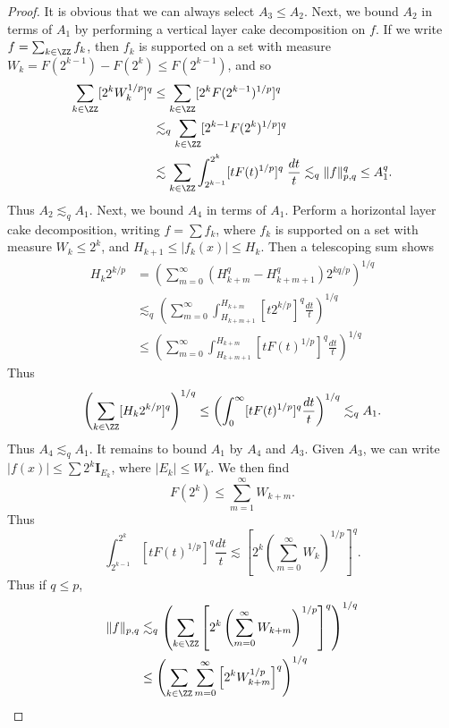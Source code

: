 \begin{proof}
    It is obvious that we can always select $A_3 \leq A_2$. Next, we bound $A_2$ in terms of $A_1$ by performing a vertical layer cake decomposition on $f$. If we write $f = \sum_{k \in \ZZ} f_k$, then $f_k$ is supported on a set with measure $W_k = F(2^{k-1}) - F(2^k) \leq F(2^{k-1})$, and so
    \begin{align*}
        \sum_{k \in \ZZ} [2^k W_k^{1/p}]^q &\leq \sum_{k \in \ZZ} [2^k F(2^{k-1})^{1/p}]^q\\
        &\lesssim_q \sum_{k \in \ZZ} [2^{k-1} F(2^k)^{1/p}]^q\\
        &\lesssim \sum_{k \in \ZZ} \int_{2^{k-1}}^{2^k} [tF(t)^{1/p}]^q\; \frac{dt}{t} \lesssim_q \| f \|_{p,q}^q \leq A_1^q.
    \end{align*}
    Thus $A_2 \lesssim_q A_1$. Next, we bound $A_4$ in terms of $A_1$. Perform a horizontal layer cake decomposition, writing $f = \sum f_k$, where $f_k$ is supported on a set with measure $W_k \leq 2^k$, and $H_{k+1} \leq |f_k(x)| \leq H_k$. Then a telescoping sum shows
    \begin{align*}
        H_k 2^{k/p} &= \left( \sum_{m = 0}^\infty (H_{k+m}^q - H_{k+m+1}^q) 2^{kq /p} \right)^{1/q}\\
        &\lesssim_q \left( \sum_{m = 0}^\infty \int_{H_{k+m+1}}^{H_{k+m}} [t 2^{k/p}]^q \frac{dt}{t} \right)^{1/q}\\
        &\leq \left( \sum_{m = 0}^\infty \int_{H_{k+m+1}}^{H_{k+m}} [t F(t)^{1/p}]^q \frac{dt}{t} \right)^{1/q}
    \end{align*}
    Thus
    \[ \left( \sum_{k \in \ZZ} [H_k 2^{k/p}]^q \right)^{1/q} \leq \left( \int_0^\infty [t F(t)^{1/p}]^q \frac{dt}{t} \right)^{1/q} \lesssim_q A_1. \]
    Thus $A_4 \lesssim_q A_1$. It remains to bound $A_1$ by $A_4$ and $A_3$. Given $A_3$, we can write $|f(x)| \leq \sum 2^k \mathbf{I}_{E_k}$, where $|E_k| \leq W_k$. We then find
    \[ F(2^k) \leq \sum_{m = 1}^\infty W_{k+m}. \]
    Thus
    \[ \int_{2^{k-1}}^{2^k} [t F(t)^{1/p}]^q \frac{dt}{t} \lesssim \left[ 2^k \left(\sum_{m = 0}^\infty W_k \right)^{1/p} \right]^q. \]
    Thus if $q \leq p$,
    \begin{align*}
        \| f \|_{p,q} &\lesssim_q \left( \sum_{k \in \ZZ} \left[2^k \left( \sum_{m = 0}^\infty W_{k+m} \right)^{1/p} \right]^q \right)^{1/q}\\
        &\leq \left( \sum_{k \in \ZZ} \sum_{m = 0}^\infty \left[ 2^k W_{k+m}^{1/p} \right]^q \right)^{1/q}\\

\end{align*}
\end{proof}
